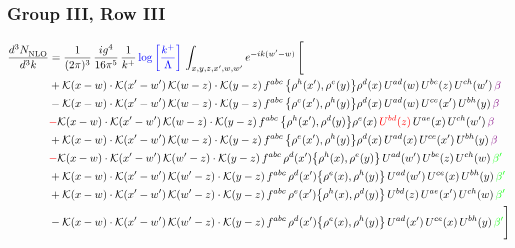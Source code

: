 \documentclass[9pt]{article}
\newcommand{\chg}[1]{{\color{red}#1}}
\numberwithin{equation}{section}
\begin{document}
\subsubsection{Group III, Row III} 
\begin{align}
     \frac{d^{3}N_{\rm NLO}^{\rm}}{d^{3}k}  & = \frac{1}{(2\pi)^{3}}\, \frac{ig^{4}}{16\pi^{5}}\, \frac{1}{k^{+}}\, {\color{blue}\log{\left[\frac{k^{+}}{\Lambda}\right]}}\, \int_{x,y,z,x^{\prime},w,w^{\prime}}e^{-ik(w^{\prime}-w)}\, \Bigg[\notag \\ & +\mathcal{K}(x-w)\cdot\mathcal{K}(x'-w')\,\mathcal{K}(w-z)\cdot\mathcal{K}(y-z)\, f^{abc}\,\big\{\rho^{h}(x'),\rho^{e}(y)\big\}\rho^{d}(x)\,U^{ad}(w)\,U^{be}(z)\,U^{ch}(w')\,{\color{violet}\beta}\notag\\
&-\mathcal{K}(x-w)\cdot\mathcal{K}(x'-w')\,\mathcal{K}(w-z)\cdot\mathcal{K}(y-z)\, f^{abc}\,\big\{\rho^{e}(x'),\rho^{h}(y)\big\}\rho^{d}(x)\,U^{ad}(w)\,U^{ce}(x')\,U^{bh}(y)\,{\color{violet}\beta}\notag\\ &\chg{-}\mathcal{K}(x-w)\cdot\mathcal{K}(x'-w')\,\mathcal{K}(w-z)\cdot\mathcal{K}(y-z)\, f^{abc}\,\big\{\rho^{h}(x'),\rho^{d}(y)\big\}\rho^{e}(x)\,{\color{red}U^{bd}(z)}\,U^{ae}(x)\,U^{ch}(w')\,{\color{violet}\beta}\notag\\ & +\mathcal{K}(x-w)\cdot\mathcal{K}(x'-w')\,\mathcal{K}(w-z)\cdot\mathcal{K}(y-z)\, f^{abc}\,\big\{\rho^{e}(x'),\rho^{h}(y)\big\}\rho^{d}(x)\,U^{ad}(x)\,U^{ce}(x')\,U^{bh}(y)\,{\color{violet}\beta}\notag\\ &\chg{-}\mathcal{K}(x-w)\cdot\mathcal{K}(x'-w')\,\mathcal{K}(w'-z)\cdot\mathcal{K}(y-z)\, f^{abc}\,\rho^{d}(x')\big\{\rho^{h}(x),\rho^{e}(y)\big\}\,U^{ad}(w')\,U^{be}(z)\,U^{ch}(w)\,{\color{green}\beta'}\notag\\ &+\mathcal{K}(x-w)\cdot\mathcal{K}(x'-w')\,\mathcal{K}(w'-z)\cdot\mathcal{K}(y-z)\, f^{abc}\,\rho^{d}(x')\big\{\rho^{e}(x),\rho^{h}(y)\big\}\,U^{ad}(w')\,U^{ce}(x)\,U^{bh}(y)\,{\color{green}\beta'} \notag\\ & +\mathcal{K}(x-w)\cdot\mathcal{K}(x'-w')\,\mathcal{K}(w'-z)\cdot\mathcal{K}(y-z)\, f^{abc}\,\rho^{e}(x')\big\{\rho^{h}(x),\rho^{d}(y)\big\}\,U^{bd}(z)\,U^{ae}(x')\,U^{ch}(w)\,{\color{green}\beta'} \notag\\ & -\mathcal{K}(x-w)\cdot\mathcal{K}(x'-w')\,\mathcal{K}(w'-z)\cdot\mathcal{K}(y-z)\, f^{abc}\,\rho^{d}(x')\big\{\rho^{e}(x),\rho^{h}(y)\big\}\,U^{ad}(x')\,U^{ce}(x)\,U^{bh}(y)\,{\color{green}\beta'}\Bigg]\end{align}     
\end{document}
